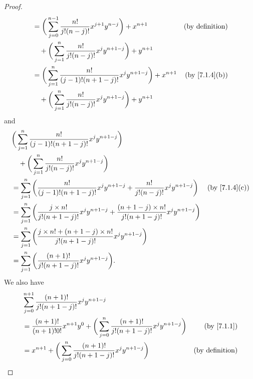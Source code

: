 \begin{proof}
\begin{align*}
                    & = \bigg(\sum_{j = 0}^{n - 1} \frac{n!}{j!(n - j)!} x^{j + 1} y^{n - j}\bigg) + x^{n + 1}   & \text{(by definition)}           \\
                    & \quad + \bigg(\sum_{j = 1}^n \frac{n!}{j!(n - j)!} x^j y^{n + 1 - j}\bigg) + y^{n + 1}                                        \\
                    & = \bigg(\sum_{j = 1}^n \frac{n!}{(j - 1)!(n + 1 - j)!} x^j y^{n + 1 - j}\bigg) + x^{n + 1} & \text{(by \cref{7.1.4}(b))}      \\
                    & \quad + \bigg(\sum_{j = 1}^n \frac{n!}{j!(n - j)!} x^j y^{n + 1 - j}\bigg) + y^{n + 1}
  \end{align*}
  and
  \begin{align*}
     & \bigg(\sum_{j = 1}^n \frac{n!}{(j - 1)!(n + 1 - j)!} x^j y^{n + 1 - j}\bigg)                                                                                                     \\
     & \quad + \bigg(\sum_{j = 1}^n \frac{n!}{j!(n - j)!} x^j y^{n + 1 - j}\bigg)                                                                                                       \\
     & = \sum_{j = 1}^n \bigg(\frac{n!}{(j - 1)!(n + 1 - j)!} x^j y^{n + 1 - j} + \frac{n!}{j!(n - j)!} x^j y^{n + 1 - j}\bigg)                           & \text{(by \cref{7.1.4}(c))} \\
     & = \sum_{j = 1}^n \bigg(\frac{j \times n!}{j!(n + 1 - j)!} x^j y^{n + 1 - j} + \frac{(n + 1 - j) \times n!}{j!(n + 1 - j)!} x^j y^{n + 1 - j}\bigg)                               \\
     & = \sum_{j = 1}^n \bigg(\frac{j \times n! + (n + 1 - j) \times n!}{j!(n + 1 - j)!} x^j y^{n + 1 - j}\bigg)                                                                        \\
     & = \sum_{j = 1}^n \bigg(\frac{(n + 1)!}{j!(n + 1 - j)!} x^j y^{n + 1 - j}\bigg).
  \end{align*}
  We also have
  \begin{align*}
     & \sum_{j = 0}^{n + 1} \frac{(n + 1)!}{j!(n + 1 - j)!} x^j y^{n + 1 - j}                                                                                    \\
     & = \frac{(n + 1)!}{(n + 1)! 0!} x^{n + 1} y^0 + \bigg(\sum_{j = 0}^n \frac{(n + 1)!}{j!(n + 1 - j)!} x^j y^{n + 1 - j}\bigg) & \text{(by \cref{7.1.1})}    \\
     & = x^{n + 1} + \bigg(\sum_{j = 0}^n \frac{(n + 1)!}{j!(n + 1 - j)!} x^j y^{n + 1 - j}\bigg)                                  & \text{(by definition)}      \\

\end{align*}
\end{proof}
